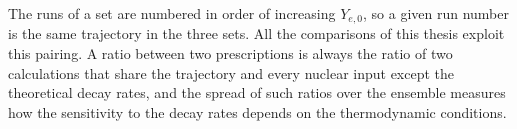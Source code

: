 The runs of a set are numbered in order of increasing $Y_{e,0}$, so a given run number is the same trajectory in the three sets.
All the comparisons of this thesis exploit this pairing.
A ratio between two prescriptions is always the ratio of two calculations that share the trajectory and every nuclear input except the theoretical decay rates, and the spread of such ratios over the ensemble measures how the sensitivity to the decay rates depends on the thermodynamic conditions.